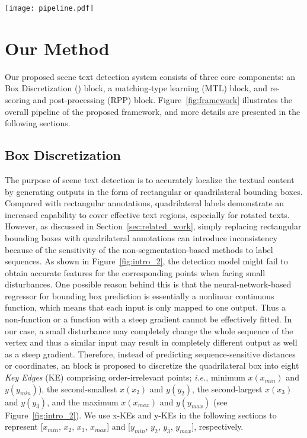  
\begin{figure*}[t!]
  \centering
  \texttt{[image: pipeline.pdf]}
  \caption{Overview of the proposed detection framework.}
  \label{fig:framework}
\end{figure*}

\section{Our Method}

Our proposed scene text detection system consists of three core components: an \Orderless Box Discretization (\Ours) block, a matching-type learning (MTL) block, and re-scoring and post-processing (RPP) block. Figure~\ref{fig:framework} illustrates the overall pipeline of the proposed framework, and more details are presented in the following sections.

\subsection{ \Orderless Box Discretization}
\label{sec:module}

The purpose of \multioriented scene text detection is to accurately localize the textual content by generating outputs in the form of rectangular or quadrilateral bounding boxes. Compared with rectangular annotations, quadrilateral labels demonstrate an increased capability to cover effective text regions, especially for rotated texts. However, as discussed in Section~\ref{sec:related_work}, simply replacing rectangular bounding boxes with quadrilateral annotations can introduce inconsistency because of the sensitivity of the non-segmentation-based methods to label sequences. As shown in Figure~\ref{fig:intro_2}, the detection model might fail to obtain accurate features for the corresponding points when facing small disturbances. One possible reason behind this is that the neural-network-based regressor for bounding box prediction is essentially a nonlinear continuous function, which means that each input is only mapped to one output. Thus a non-function or a function with a steep gradient cannot be effectively fitted. In our case, a small disturbance may completely change the whole sequence of the vertex and thus a similar input may result in completely different output as well as a steep gradient. Therefore, instead of predicting sequence-sensitive distances or coordinates, an \Ours block is proposed to discretize the quadrilateral box into eight \textit{Key Edges} (KE) comprising order-irrelevant points;
\emph{i.e.}, minimum $x(x_{min})$ and $y(y_{min})$), the second-smallest $x(x_{2})$ and $y(y_{2})$, the second-largest $x(x_{3})$ and $y(y_{3})$, and the maximum $x(x_{max})$ and $y(y_{max})$ (see Figure~\ref{fig:intro_2}). We use x-KEs and y-KEs in the following sections to represent [$x_{min}$, $x_{2}$, $x_{3}$, $x_{max}$] and [$y_{min}$, $y_{2}$, $y_{3}$, $y_{max}$], respectively.

